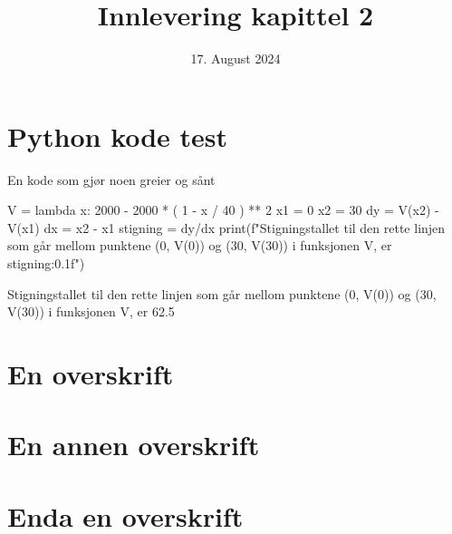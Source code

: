 

\title{Innlevering kapittel 2}
\date{17. August 2024}


\maketitle
\tableofcontents
\hr

\section{Python kode test}
\begin{codebox}{En kode som gjør noen greier og sånt}
  \begin{pythoncode}
    V = lambda x: 2000 - 2000 * ( 1 - x / 40 ) ** 2
    x1 = 0
    x2 = 30
    dy = V(x2) - V(x1)
    dx = x2 - x1
    stigning = dy/dx
    print(f"Stigningstallet til den rette linjen som går mellom punktene (0, V(0)) og (30, V(30)) i funksjonen V, er {stigning:0.1f}")
  \end{pythoncode}


  \begin{coderesult}
    Stigningstallet til den rette linjen som går mellom punktene (0, V(0)) og (30, V(30)) i funksjonen V, er 62.5
  \end{coderesult}
\end{codebox}

\section{En overskrift}
\lipsum[1-20]

\section{En annen overskrift}
\lipsum[21-40]

\section{Enda en overskrift}
\lipsum[41-50]

